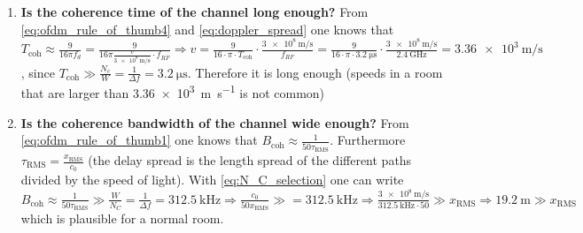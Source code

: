 \begin{enumerate}
    \item \textbf{Is the coherence time of the channel long enough?} \newline
    From \autoref{eq:ofdm_rule_of_thumb4} and \autoref{eq:doppler_spread} one knows that $T_{\mathrm{coh}} \approx \frac{9}{16 \pi f_d}=\frac{9}{16 \pi \frac{v}{\SI{3e8}{\meter\per\second}}\cdot f_{RF}} \Rightarrow v=\frac{9}{16\cdot \pi \cdot T_{\mathrm{coh}}}\cdot \frac{\SI{3e8}{\meter\per\second}}{f_{RF}}=\frac{9}{16\cdot \pi \cdot \SI{3.2}{\micro\second}}\cdot \frac{\SI{3e8}{\meter\per\second}}{\SI{2.4}{\giga\hertz}}=\SI{3.36e3}{\meter\per\second}$, since $T_{\mathrm{coh}} \gg \frac{N_c}{W}=\frac{1}{\Delta f}=\SI{3.2}{\micro\second}$. Therefore it is long enough (speeds in a room that are larger than \SI{3.36e3}{\meter\per\second} is not common)
    \item \textbf{Is the coherence bandwidth of the channel wide enough?}\newline
    From \autoref{eq:ofdm_rule_of_thumb1} one knows that $B_{\mathrm{coh}} \approx \frac{1}{50 \tau_{\mathrm{RMS}}}$. Furthermore $\tau_{\mathrm{RMS}}=\frac{x_{\mathrm{RMS}}}{c_0}$ (the delay spread is the length spread of the different paths divided by the speed of light). With \autoref{eq:N_C_selection} one can write $B_{\mathrm{coh}} \approx \frac{1}{50 \tau_{\mathrm{RMS}}} \gg \frac{W}{N_C}=\frac{1}{\Delta f}=\SI{312.5}{\kilo\hertz} \Rightarrow \frac{c_0}{50 x_{\mathrm{RMS}}} \gg  = \SI{312.5}{\kilo\hertz} \Rightarrow \frac{\SI{3e8}{\meter\per\second}}{\SI{312.5}{\kilo\hertz} \cdot 50} \gg x_{\mathrm{RMS}} \Rightarrow \SI{19.2}{\meter} \gg x_{\mathrm{RMS}}$ which is plausible for a normal room.
\end{enumerate}

